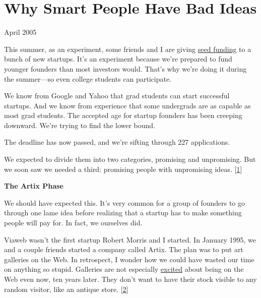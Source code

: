 \chapter{Why Smart People Have Bad Ideas}


            
              
                


                  
                    April 2005

This summer, as an experiment, some
                    friends and I are giving
                    \href{http://ycombinator.com}{seed funding} to a bunch
                    of new startups. It's an experiment because we're prepared
                    to fund younger founders than most investors would. That's
                    why we're doing it during the summer---so even college
                    students can participate.

We know from Google and
                    Yahoo that grad students can start successful startups. And
                    we know from experience that some undergrads are as capable
                    as most grad students. The accepted age for startup founders
                    has been creeping downward. We're trying to find the lower
                    bound.


                    The deadline has now passed, and we're sifting through 227
                    applications.
                    
                    We expected to divide them into two categories, promising
                    and unpromising. But we soon saw we needed a third:
                    promising people with unpromising ideas.
                    [\href{\#f1n}{1}]

\textbf{The Artix Phase}

We should
                    have expected this. It's very common for a group of founders
                    to go through one lame idea before realizing that a startup
                    has to make something people will pay for. In fact, we
                    ourselves did.

Viaweb wasn't the first startup
                    Robert Morris and I started. In January 1995, we and a
                    couple friends started a company called Artix. The plan was
                    to put art galleries on the Web. In retrospect, I wonder how
                    we could have wasted our time on anything so stupid.
                    Galleries are not especially
                    \href{http://www.knoedlergallery.com/}{excited} about
                    being on the Web even now, ten years later. They don't want
                    to have their stock visible to any random visitor, like an
                    antique store.
                    [\href{\#f2n}{2}]

